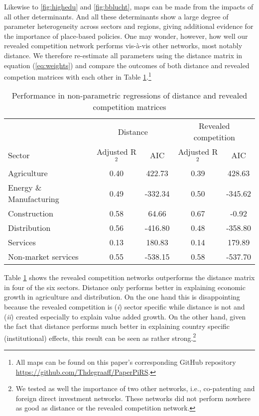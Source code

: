 \documentclass[11pt,parskip,abstracton,notitlepage, paper=a4]{scrartcl}
\begin{document}
Likewise to \ref{fig:highedu} and \ref{fig:bblucht}, maps can be made from the impacts of all other determinants. And all these determinants show a large degree of parameter heterogeneity across sectors and regions, giving additional evidence for the importance of place-based policies. One may wonder, however, how well our revealed competition network performs vis-\`{a}-vis other networks, most notably distance. We therefore re-estimate all parameters using the distance matrix in equation (\ref{eq:weights}) and compare the outcomes of both distance and revealed competion matrices with each other in Table \ref{tab:performance}.\footnote{All maps can be found on this paper's corresponding GitHub repository \url{https://github.com/Thdegraaff/PaperPiRS}.}

\begin{table}[ht]
	\centering
	\caption{Performance in non-parametric regressions of distance and revealed competition matrices}
	\label{tab:performance}
	\begin{tabular*}{\textwidth}{l @{\extracolsep{\fill}} cccc}
		\toprule
		 & \multicolumn{2}{c}{Distance} & \multicolumn{2}{c}{Revealed competition} \\
		 		\cmidrule(r){2-3} \cmidrule(r){4-5} 
		Sector & Adjusted R$^2$ & AIC& Adjusted R$^2$ & AIC  \\
		\midrule
		Agriculture 			& 0.40 & 422.73 	& 0.39 & 428.63\\
		Energy \& Manufacturing & 0.49 & -332.34 	& 0.50 & -345.62 \\ 
		Construction 			& 0.58 & 64.66 		& 0.67 & -0.92 \\
		Distribution 			& 0.56 & -416.80 	& 0.48 	& -358.80\\
		Services 				& 0.13 & 180.83 	& 0.14 	& 179.89\\
		Non-market services 	& 0.55 & -538.15 	& 0.58 & -537.70\\ 
		\bottomrule
	\end{tabular*}
\end{table}

Table \ref{tab:performance} shows the revealed competition networks outperforms the distance matrix in four of the six sectors. Distance only performs better in explaining economic growth in agriculture and distribution. On the one hand this is disappointing because the revealed competition is (\textit{i}) sector specific while distance is not and (\textit{ii}) created especially to explain value added growth. On the other hand, given the fact that distance performs much better in explaining country specific (institutional) effects, this result can be seen as rather strong.\footnote{We tested as well the importance of two other networks, i.e., co-patenting and foreign direct investment networks. These networks did not perform nowhere as good as distance or the revealed competition network.}
\end{document}
